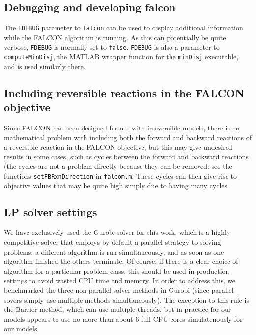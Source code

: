 \subsection{Debugging and developing falcon}
The \texttt{FDEBUG} parameter to \texttt{falcon} can be used to
display additional information while the FALCON algorithm is
running. As this can potentially be quite verbose, \texttt{FDEBUG} is
normally set to \texttt{false}. \texttt{FDEBUG} is also a parameter to
\texttt{computeMinDisj}, the MATLAB wrapper function for the
\texttt{minDisj} executable, and is used similarly there.


\subsection{Including reversible reactions in the FALCON objective}
Since FALCON has been designed for use with irreversible models, there
is no mathematical problem with including both the forward and
backward reactions of a reversible reaction in the FALCON objective,
but this may give undesired results in some cases, such as cycles
between the forward and backward reactions (the cycles are not a
problem directly because they can be removed: see the functions
\texttt{setFBRxnDirection} in \texttt{falcom.m}.  These cycles can
then give rise to objective values that may be quite high simply due
to having many cycles.


\subsection{LP solver settings}
We have exclusively used the Gurobi solver \citep{gurobi} for this
work, which is a highly competitive solver that employs by default a
parallel strategy to solving problems: a different algorithm is run
simultaneously, and as soon as one algorithm finished the others
terminate. Of course, if there is a clear choice of algorithm for a
particular problem class, this should be used in production settings
to avoid wasted CPU time and memory. In order to address this, we
benchmarked the three non-parallel solver methods in Gurobi
 (since parallel sovers simply use multiple methods simultaneously).
The exception to this rule is the Barrier method, which can use
multiple threads, but in practice for our models appears to use
no more than about 6 full CPU cores simulatenously for our models.

